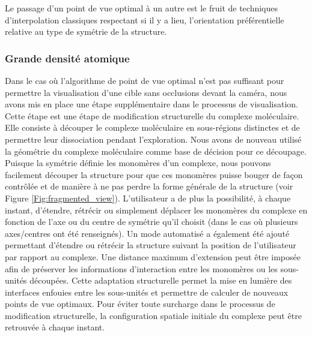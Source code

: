 Le passage d'un point de vue optimal à un autre est le fruit de techniques d'interpolation classiques respectant si il y a lieu, l'orientation préférentielle relative au type de symétrie de la structure.


\subsubsection{Grande densité atomique}


Dans le cas où l'algorithme de point de vue optimal n'est pas suffisant pour permettre la visualisation d'une cible sans occlusions devant la caméra, nous avons mis en place une étape supplémentaire dans le processus de visualisation. Cette étape est une étape de modification structurelle du complexe moléculaire. Elle consiste à découper le complexe moléculaire en sous-régions distinctes et de permettre leur dissociation pendant l'exploration. %
Nous avons de nouveau utilisé la géométrie du complexe moléculaire comme base de décision pour ce découpage. Puisque la symétrie définie les monomères d'un complexe, nous pouvons facilement découper la structure pour que ces monomères puisse bouger de façon contrôlée et de manière à ne pas perdre la forme générale de la structure (voir Figure \ref{Fig:fragmented_view}). L'utilisateur a de plus la possibilité, à chaque instant, d'étendre, rétrécir ou simplement déplacer les monomères du complexe en fonction de l'axe ou du centre de symétrie qu'il choisit (dans le cas où plusieurs axes/centres ont été renseignés). Un mode automatisé a également été ajouté permettant d'étendre ou rétrécir la structure suivant la position de l'utilisateur par rapport au complexe. Une distance maximum d'extension peut être imposée afin de préserver les informations d'interaction entre les monomères ou les sous-unités découpées. Cette adaptation structurelle permet la mise en lumière des interfaces enfouies entre les sous-unités et permettre de calculer de nouveaux points de vue optimaux. Pour éviter toute surcharge dans le processus de modification structurelle, la configuration spatiale initiale du complexe peut être retrouvée à chaque instant.

